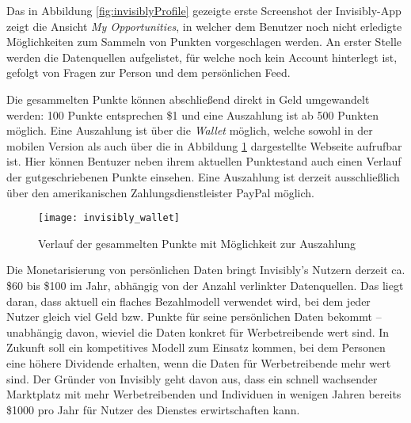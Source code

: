 \noindent Das in Abbildung \ref{fig:invisiblyProfile} gezeigte erste Screenshot der Invisibly-App zeigt die Ansicht \textit{My Opportunities}, in welcher dem Benutzer noch nicht erledigte Möglichkeiten zum Sammeln von Punkten vorgeschlagen werden. An erster Stelle werden die Datenquellen aufgelistet, für welche noch kein Account hinterlegt ist, gefolgt von Fragen zur Person und dem persönlichen Feed. \newline

\noindent Die gesammelten Punkte können abschließend direkt in Geld umgewandelt werden: 100 Punkte entsprechen \$1 und eine Auszahlung ist ab 500 Punkten möglich. \cite{invisiblyWhyPay_2021} Eine Auszahlung ist über die \textit{Wallet} möglich, welche sowohl in der mobilen Version als auch über die in Abbildung \ref{fig:invisiblyWallet} dargestellte Webseite aufrufbar ist. Hier können Bentuzer neben ihrem aktuellen Punktestand auch einen Verlauf der gutgeschriebenen Punkte einsehen. Eine Auszahlung ist derzeit ausschließlich über den amerikanischen Zahlungsdienstleister PayPal möglich. \newline

\begin{figure}[!ht]
	\centering
	\texttt{[image: invisibly\_wallet]}
	\caption{Verlauf der gesammelten Punkte mit Möglichkeit zur Auszahlung}
	\label{fig:invisiblyWallet}
\end{figure}

\noindent Die Monetarisierung von persönlichen Daten bringt Invisibly's Nutzern derzeit ca. \$60 bis \$100 im Jahr, abhängig von der Anzahl verlinkter Datenquellen. Das liegt daran, dass aktuell ein flaches Bezahlmodell verwendet wird, bei dem jeder Nutzer gleich viel Geld bzw. Punkte für seine persönlichen Daten bekommt -- unabhängig davon, wieviel die Daten konkret für Werbetreibende wert sind. In Zukunft soll ein kompetitives Modell zum Einsatz kommen, bei dem Personen eine höhere Dividende erhalten, wenn die Daten für Werbetreibende mehr wert sind. \cite{pymntsInvisibly_2021} Der Gründer von Invisibly geht davon aus, dass ein schnell wachsender Marktplatz mit mehr Werbetreibenden und Individuen in wenigen Jahren bereits \$1000 pro Jahr für Nutzer des Dienstes erwirtschaften kann. \cite{techRadarInvisibly_2021} 